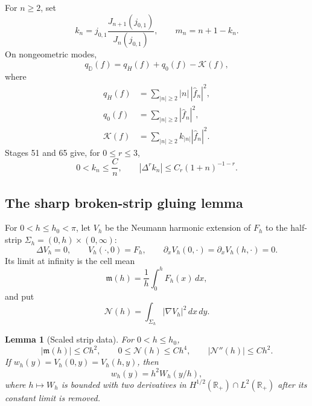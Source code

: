 \documentclass[11pt]{amsart}
\numberwithin{equation}{section}
\newtheorem{lemma}[theorem]{Lemma}
\theoremstyle{definition}
\theoremstyle{remark}
\newcommand{\qD}{q_{\mathbb D}}
\newcommand{\qdot}{q_{\dot H}}
\newcommand{\qzero}{q_0}
\newcommand{\kform}{\mathcal K}
\begin{document}
For \(n\ge2\), set
\begin{equation}\label{F129:eq:symbols}
 k_n=j_{0,1}\frac{J_{n+1}(j_{0,1})}{J_n(j_{0,1})},
 \qquad m_n=n+1-k_n.
\end{equation}
On nongeometric modes,
\begin{equation}\label{F129:eq:split}
 \qD(f)=\qdot(f)+\qzero(f)-\kform(f),
\end{equation}
where
\begin{align}
 \qdot(f)&=\sum_{|n|\ge2}|n|\,|\widehat f_n|^2,\label{F129:eq:qdot}\\
 \qzero(f)&=\sum_{|n|\ge2}|\widehat f_n|^2,\label{F129:eq:qzero}\\
 \kform(f)&=\sum_{|n|\ge2}k_{|n|}|\widehat f_n|^2.\label{F129:eq:kform}
\end{align}
Stages 51 and 65 give, for \(0\le r\le3\),
\begin{equation}\label{F129:eq:k-symbol}
 0<k_n\le\frac Cn,\qquad
 |\Delta^rk_n|\le C_r(1+n)^{-1-r}.
\end{equation}

\subsection{The sharp broken-strip gluing lemma}

For \(0<h\le h_0<\pi\), let \(V_h\) be the Neumann harmonic extension of
\(F_h\) to the half-strip
\(\Sigma_h=(0,h)\times(0,\infty)\):
\begin{equation}\label{F129:eq:strip-problem}
 \Delta V_h=0,\qquad V_h(\cdot,0)=F_h,\qquad
 \partial_xV_h(0,\cdot)=\partial_xV_h(h,\cdot)=0.
\end{equation}
Its limit at infinity is the cell mean
\begin{equation}\label{F129:eq:mean}
 \mathfrak m(h)=\frac1h\int_0^hF_h(x)\,dx,
\end{equation}
and put
\begin{equation}\label{F129:eq:N}
 \mathcal N(h)=\int_{\Sigma_h}|\nabla V_h|^2\,dx\,dy.
\end{equation}

\begin{lemma}[Scaled strip data]\label{F129:lem:scaled}
For \(0<h\le h_0\),
\begin{equation}\label{F129:eq:scaled-bounds}
 |\mathfrak m(h)|\le Ch^2,\qquad
 0\le\mathcal N(h)\le Ch^4,\qquad
 |\mathcal N''(h)|\le Ch^2.
\end{equation}
If \(w_h(y)=V_h(0,y)=V_h(h,y)\), then
\begin{equation}\label{F129:eq:wall-scale}
 w_h(y)=h^2W_h(y/h),
\end{equation}
where \(h\mapsto W_h\) is bounded with two derivatives in
\(H^{1/2}(\mathbb R_+)\cap L^2(\mathbb R_+)\) after its constant limit is
removed.
\end{lemma}
\end{document}
